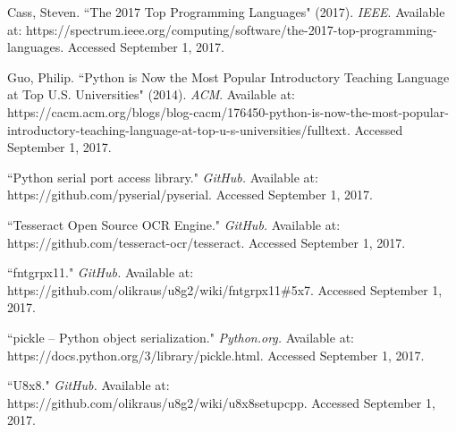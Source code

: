 \documentclass[12pt]{article}
\begin{document}
\begin{thebibliography}{}
Cass, Steven.  ``The 2017 Top Programming Languages" (2017).  \textit{IEEE}.  Available at: 
https://spectrum.ieee.org/computing/software/the-2017-top-programming-languages.  Accessed September 1, 2017.

Guo, Philip.  ``Python is Now the Most Popular Introductory Teaching Language at Top U.S. Universities" (2014).  \textit{ACM}.  Available at:
https://cacm.acm.org/blogs/blog-cacm/176450-python-is-now-the-most-popular-introductory-teaching-language-at-top-u-s-universities/fulltext.  Accessed September 1, 2017.

``Python serial port access library." \textit{GitHub.}  Available at:
https://github.com/pyserial/pyserial.  Accessed September 1, 2017.

``Tesseract Open Source OCR Engine." \textit{GitHub.} Available at:
https://github.com/tesseract-ocr/tesseract.  Accessed September 1, 2017.

``fntgrpx11." \textit{GitHub.}  Available at:
https://github.com/olikraus/u8g2/wiki/fntgrpx11\#5x7.  Accessed September 1, 2017.

``pickle -- Python object serialization." \textit{Python.org.}  Available at: 
https://docs.python.org/3/library/pickle.html.  Accessed September 1, 2017.

``U8x8." \textit{GitHub.}  Available at:
https://github.com/olikraus/u8g2/wiki/u8x8setupcpp.  Accessed September 1, 2017.

\end{thebibliography}
\end{document}
